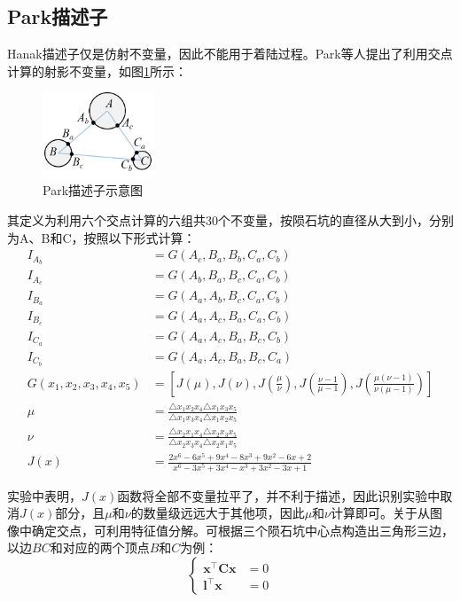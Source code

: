 \documentclass{article}
\begin{document}
\subsection{Park描述子}
Hanak描述子仅是仿射不变量，因此不能用于着陆过程。Park\cite{parkRobustCraterTriangle2019}等人提出了利用交点计算的射影不变量，如图\ref{fig:Park}所示：
\begin{figure}[H]
  \centering
  \includegraphics[width=0.3\textwidth]{Park三元组.png}
  \caption{Park描述子示意图}
  \label{fig:Park}
\end{figure}\par
其定义为利用六个交点计算的六组共30个不变量，按陨石坑的直径从大到小，分别为A、B和C，按照以下形式计算：
\begin{align*}
  I_{A_b}&=G(A_c,B_a,B_b,C_a,C_b)\\
  I_{A_c}&=G(A_b,B_a,B_c,C_a,C_b)\\
  I_{B_a}&=G(A_a,A_b,B_c,C_a,C_b)\\
  I_{B_c}&=G(A_a,A_c,B_a,C_a,C_b)\\
  I_{C_a}&=G(A_a,A_c,B_a,B_c,C_b)\\
  I_{C_b}&=G(A_a,A_c,B_a,B_c,C_a)\\
  G(x_1,x_2,x_3,x_4,x_5)&=\left[J(\mu),J(\nu),J\left(\frac{\mu}{\nu}\right),J\left(\frac{\nu-1}{\mu-1}\right),J\left(\frac{\mu(\nu-1)}{\nu(\mu-1)}\right)\right]\\
  \mu& = \frac{\triangle x_1x_2x_4\triangle x_1x_3x_5}{\triangle x_1x_3x_4\triangle x_1x_2x_5}\\
  \nu&=\frac{\triangle x_2x_1x_4\triangle x_2x_3x_5}{\triangle x_2x_3x_4\triangle x_2x_1x_5}\\
  J(x)&=\frac{2x^6-6x^5+9x^4-8x^3+9x^2-6x+2}{x^6-3x^5+3x^4-x^3+3x^2-3x+1}
\end{align*}\par
实验中表明，$J(x)$函数将全部不变量拉平了，并不利于描述，因此识别实验中取消$J(x)$部分，且$\mu$和$\nu$的数量级远远大于其他项，因此$\mu$和$\nu$计算即可。关于从图像中确定交点，可利用特征值分解。可根据三个陨石坑中心点构造出三角形三边，以边$BC$和对应的两个顶点$B$和$C$为例：
\begin{equation*}
  \left\{
  \begin{aligned}
    \mathbf{x^\top Cx}&=0\\
    \mathbf{l^\top x}&=0  
  \end{aligned}
  \right.
\end{equation*}\par
\end{document}
